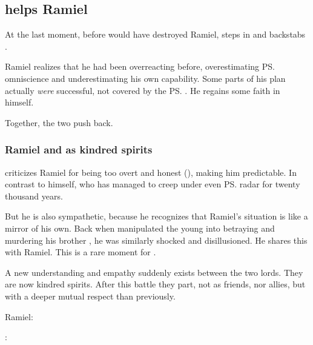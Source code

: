 \subsection{\Azraid helps Ramiel}
At the last moment, before \Daggerrain{} would have destroyed Ramiel, \Azraid{} steps in and backstabs \Daggerrain. 

Ramiel realizes that he had been overreacting before, overestimating \ps{\Daggerrain}{} omniscience and underestimating his own capability. 
Some parts of his plan actually \emph{were} successful, not covered by the \ps{\banelord}{} . 
He regains some faith in himself. 

Together, the two \satharioth{} push \Daggerrain{} back. 





\subsubsection{Ramiel and \Azraid{} as kindred spirits}
\Azraid{} criticizes Ramiel for being too overt and honest (), making him predictable. 
In contrast to \Azraid{} himself, who has managed to creep under even \ps{\Daggerrain}{} radar for twenty thousand years. 

But he is also sympathetic, because he recognizes that Ramiel's situation is like a mirror of his own. 
Back when \Daggerrain{} manipulated the young \Azraid{} into betraying and murdering his brother \Damiarch, he was similarly shocked and disillusioned. 
He shares this with Ramiel. 
This is a rare  moment for \Azraid. 

A new understanding and empathy suddenly exists between the two \resphan{} lords. 
They are now kindred spirits. 
After this battle they part, not as friends, nor allies, but with a deeper mutual respect than previously. 

\begin{prose}
  Ramiel: 

  \Azraid: 
\end{prose}






